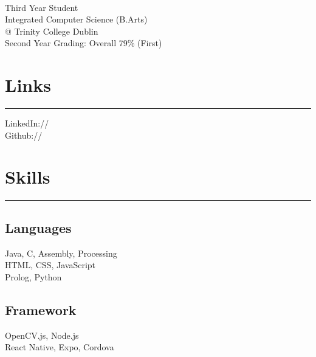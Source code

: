 \documentclass[]{rahulworld-resume}
\begin{document}
%
%

\begin{minipage}[t]{0.33\textwidth} 
\begin{large}
	\\
\end{large}
Third Year Student\\
Integrated Computer Science (B.Arts)\\ 
@ Trinity College Dublin\\ 
Second Year Grading: Overall 79\% (First)
\section{Links} 
\noindent\rule{5cm}{0.4pt}


LinkedIn://  \href{https://www.linkedin.com/in/john-keaney/}{} \\
Github:// \href{https://github.com/Keaneyjo}{}

\section{Skills}
\noindent\rule{5cm}{0.4pt}
\vspace{6pt}
\subsection{Languages}
Java, C, Assembly, Processing\\
HTML, CSS, JavaScript\\
Prolog, Python\\


\vspace{6pt}
\subsection{Framework}
OpenCV.js, Node.js\\
React Native, Expo, Cordova\\



\end{minipage}
\end{document}
